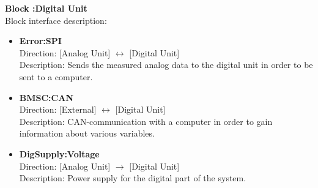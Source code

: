 \textbf{Block :Digital Unit}\\
Block interface description:
\begin{itemize}
	\item \textbf{Error:SPI}\\
	Direction: [Analog Unit] $\leftrightarrow$ [Digital Unit]\\
	Description: Sends the measured analog data to the digital unit in order to be sent to a computer.
	\item \textbf{BMSC:CAN}\\
	Direction: [External] $\leftrightarrow$ [Digital Unit]\\
	Description: CAN-communication with a computer in order to gain information about various variables.
	\item \textbf{DigSupply:Voltage}\\
	Direction: [Analog Unit] $\rightarrow$ [Digital Unit]\\
	Description: Power supply for the digital part of the system.
\end{itemize}

